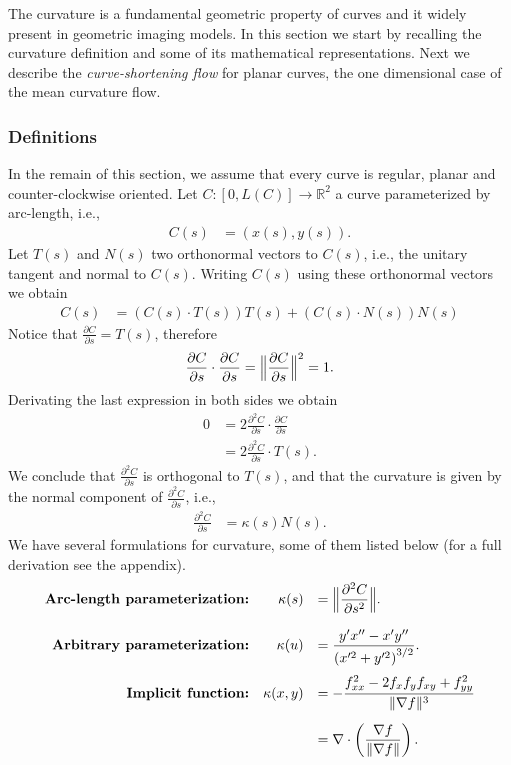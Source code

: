 The curvature is a fundamental geometric property of curves and it widely present in geometric imaging models. In this section we start by recalling the curvature definition and some of its mathematical representations. Next we describe the \emph{curve-shortening flow} for planar curves, the one dimensional case of the mean curvature flow.

\subsubsection{Definitions}
In the remain of this section, we assume that every curve is regular, planar and counter-clockwise oriented. Let $C:[0,L(C)]\rightarrow \mathbb{R}^2$ a curve parameterized by arc-length, i.e.,
\begin{align*}
	C(s) &= (x(s),y(s)).
\end{align*}
%
Let $T(s)$ and $N(s)$ two orthonormal vectors to $C(s)$, i.e., the unitary tangent and normal to $C(s)$. Writing $C(s)$ using these orthonormal vectors we obtain
\begin{align*}
	C(s) &= \left( C(s) \cdot T(s) \right)T(s) + \left( C(s) \cdot N(s) \right)N(s)
\end{align*}
%
Notice that $\frac{\partial C}{\partial s} = T(s)$, therefore
\begin{align*}
	\frac{\partial C}{\partial s} \cdot \frac{\partial C}{\partial s} = \Big\lVert \frac{ \partial C}{\partial s} \Big\rVert^2 = 1.
\end{align*}
%
Derivating the last expression in both sides we obtain
\begin{align*}
	0 &= 2\frac{\partial ^2 C}{\partial s} \cdot \frac{\partial C}{\partial s} \\
	  &= 2\frac{\partial ^2 C}{\partial s} \cdot T(s).
\end{align*}
%
We conclude that $\frac{\partial ^2 C}{\partial s}$ is orthogonal to $T(s)$, and that the curvature is given by the normal component of $\frac{\partial ^2 C}{\partial s}$, i.e.,
\begin{align*}
	\frac{\partial ^2 C}{\partial s} &= \kappa(s) N(s).
\end{align*}
%
We have several formulations for curvature, some of them listed below (for a full derivation see the appendix). 
\begin{align*}
\begin{array}{rrl}
	\textbf{Arc-length parameterization:} & \displaystyle \kappa(s) &= \displaystyle \Big\lVert \frac{\partial^2 C}{\partial s^2} \Big\rVert. \\[1.5em]	
	\textbf{Arbitrary parameterization:} & \displaystyle \kappa(u) &= \displaystyle \frac{y'x'' - x'y''}{\left( x'^2 + y'^2 \right)^{3/2}}. \\[1.5em]
	\textbf{Implicit function:} & \displaystyle \kappa(x,y) &= \displaystyle -\frac{f_{xx}^2 - 2f_xf_yf_{xy} + f_{yy}^2}{\lVert\nabla f\rVert^3} \\[1.5em]
	&&= \displaystyle \nabla \cdot \left( \frac{\nabla f}{\lVert\nabla f\rVert} \right).
\end{array}
\end{align*}
%
%

